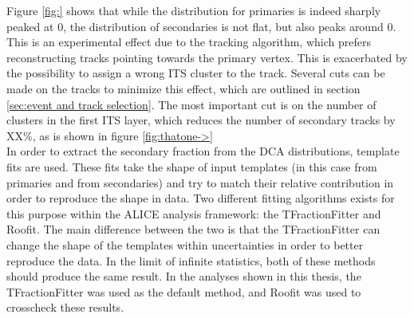 Figure \ref{fig:} shows that while the distribution for primaries is indeed sharply peaked at 0, the distribution of secondaries is not flat, but also peaks around 0. This is an experimental effect due to the tracking algorithm, which prefers reconstructing tracks pointing towards the primary vertex. This is exacerbated by the possibility to assign a wrong ITS cluster to the track. Several cuts can be made on the tracks to minimize this effect, which are outlined in section \ref{sec:event and track selection}. The most important cut is on the number of clusters in the first ITS layer, which reduces the number of secondary tracks by XX\%, as is shown in figure \ref{fig:thatone->} %
\\
In order to extract the secondary fraction from the DCA distributions, template fits are used. These fits take the shape of input templates (in this case from primaries and from secondaries) and try to match their relative contribution in order to reproduce the shape in data. Two different fitting algorithms exists for this purpose within the ALICE analysis framework: the TFractionFitter and Roofit. The main difference between the two is that the TFractionFitter can change the shape of the templates within uncertainties in order to better reproduce the data. In the limit of infinite statistics, both of these methods should produce the same result. In the analyses shown in this thesis, the TFractionFitter was used as the default method, and Roofit was used to crosscheck these results. \\
